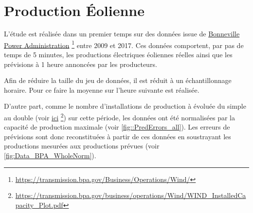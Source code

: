 \documentclass[12pt]{report}
\begin{document}
\section{Production Éolienne}
L'étude est réalisée dans un premier temps sur des données issue de \href{https://transmission.bpa.gov/Business/Operations/Wind/}{Bonneville Power Administration} \footnote{\url{https://transmission.bpa.gov/Business/Operations/Wind/}} entre 2009 et 2017. Ces données comportent, par pas de temps de 5 minutes, les productions électriques éoliennes réelles ainsi que les prévisions à 1 heure annoncées par les producteurs.

Afin de réduire la taille du jeu de données, il est réduit à un échantillonnage horaire. Pour ce faire la moyenne sur l'heure suivante est réalisée.

D'autre part, comme le nombre d'installations de production à évoluée du simple au double (voir \href{https://transmission.bpa.gov/business/operations/Wind/WIND_InstalledCapacity_Plot.pdf}{ici} \footnote{\url{https://transmission.bpa.gov/business/operations/Wind/WIND_InstalledCapacity_Plot.pdf}}) sur cette période, les données ont été normalisées par la capacité de production maximale (voir \ref{fig::PredErrors_all}). Les erreurs de prévisions sont donc reconstituées à partir de ces données en soustrayant les productions mesurées aux productions prévues (voir \ref{fig:Data_BPA_WholeNorm}).
\end{document}
